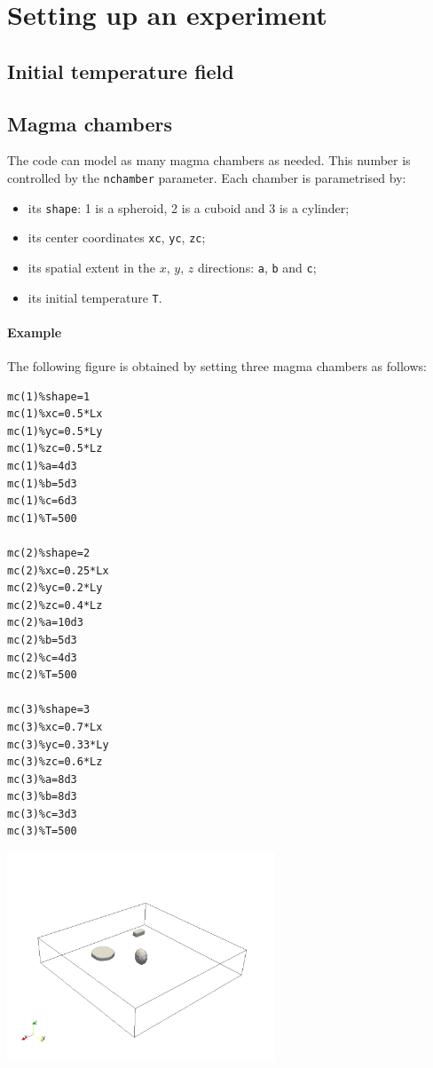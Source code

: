 \documentclass[a4paper]{article}
\begin{document}
\section{Setting up an experiment}

\subsection{Initial temperature field}


\subsection{Magma chambers}

The code can model as many magma chambers as needed. This number is controlled by the 
{\tt nchamber} parameter.
Each chamber is parametrised by:
\begin{itemize}
\item its {\tt shape}: 1 is a spheroid, 2 is a cuboid and 3 is a cylinder;  
\item its center coordinates {\tt xc}, {\tt yc}, {\tt zc};
\item its spatial extent in the $x$, $y$, $z$ directions: {\tt a}, {\tt b} and {\tt c};
\item its initial temperature {\tt T}.
\end{itemize}

\paragraph{Example} The following figure is obtained by setting three magma chambers as follows:

\begin{multicols}{2}


\begin{verbatim}
mc(1)%shape=1
mc(1)%xc=0.5*Lx
mc(1)%yc=0.5*Ly
mc(1)%zc=0.5*Lz
mc(1)%a=4d3
mc(1)%b=5d3
mc(1)%c=6d3
mc(1)%T=500

mc(2)%shape=2
mc(2)%xc=0.25*Lx
mc(2)%yc=0.2*Ly
mc(2)%zc=0.4*Lz
mc(2)%a=10d3
mc(2)%b=5d3
mc(2)%c=4d3
mc(2)%T=500

mc(3)%shape=3
mc(3)%xc=0.7*Lx
mc(3)%yc=0.33*Ly
mc(3)%zc=0.6*Lz
mc(3)%a=8d3
mc(3)%b=8d3
mc(3)%c=3d3
mc(3)%T=500
\end{verbatim}

\begin{center}
\includegraphics[width=8cm]{threechambers}
\end{center}
\end{multicols}
\end{document}
